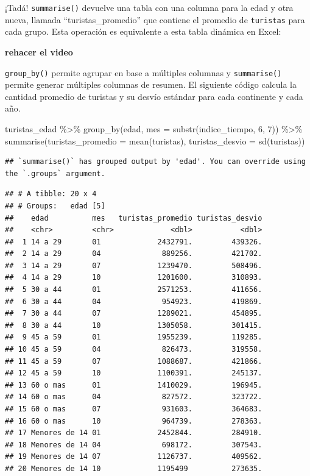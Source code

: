 \documentclass[
  openany]{book}
\newenvironment{Shaded}{\begin{snugshade}}{\end{snugshade}}
\newcommand{\AttributeTok}[1]{\textcolor[rgb]{0.77,0.63,0.00}{#1}}
\newcommand{\DecValTok}[1]{\textcolor[rgb]{0.00,0.00,0.81}{#1}}
\newcommand{\FunctionTok}[1]{\textcolor[rgb]{0.00,0.00,0.00}{#1}}
\newcommand{\NormalTok}[1]{#1}
\newcommand{\SpecialCharTok}[1]{\textcolor[rgb]{0.00,0.00,0.00}{#1}}
\begin{document}
¡Tadá!
\texttt{summarise()} devuelve una tabla con una columna para la edad y otra nueva, llamada ``turistas\_promedio'' que contiene el promedio de \texttt{turistas} para cada grupo.
Esta operación es equivalente a esta tabla dinámica en Excel:

\textbf{rehacer el video}

\texttt{group\_by()} permite agrupar en base a múltiples columnas y \texttt{summarise()} permite generar múltiples columnas de resumen.
El siguiente código calcula la cantidad promedio de turistas y su desvío estándar para cada continente y cada año.

\begin{Shaded}
\begin{Highlighting}[]
\NormalTok{turistas\_edad }\SpecialCharTok{\%\textgreater{}\%} 
  \FunctionTok{group\_by}\NormalTok{(edad, }\AttributeTok{mes =} \FunctionTok{substr}\NormalTok{(indice\_tiempo, }\DecValTok{6}\NormalTok{, }\DecValTok{7}\NormalTok{)) }\SpecialCharTok{\%\textgreater{}\%} 
  \FunctionTok{summarise}\NormalTok{(}\AttributeTok{turistas\_promedio =} \FunctionTok{mean}\NormalTok{(turistas),}
            \AttributeTok{turistas\_desvio =} \FunctionTok{sd}\NormalTok{(turistas))}
\end{Highlighting}
\end{Shaded}

\begin{verbatim}
## `summarise()` has grouped output by 'edad'. You can override using the `.groups` argument.
\end{verbatim}

\begin{verbatim}
## # A tibble: 20 x 4
## # Groups:   edad [5]
##    edad          mes   turistas_promedio turistas_desvio
##    <chr>         <chr>             <dbl>           <dbl>
##  1 14 a 29       01             2432791.         439326.
##  2 14 a 29       04              889256.         421702.
##  3 14 a 29       07             1239470.         508496.
##  4 14 a 29       10             1201600.         310893.
##  5 30 a 44       01             2571253.         411656.
##  6 30 a 44       04              954923.         419869.
##  7 30 a 44       07             1289021.         454895.
##  8 30 a 44       10             1305058.         301415.
##  9 45 a 59       01             1955239.         119285.
## 10 45 a 59       04              826473.         319558.
## 11 45 a 59       07             1088687.         421866.
## 12 45 a 59       10             1100391.         245137.
## 13 60 o mas      01             1410029.         196945.
## 14 60 o mas      04              827572.         323722.
## 15 60 o mas      07              931603.         364683.
## 16 60 o mas      10              964739.         278363.
## 17 Menores de 14 01             2452844.         284910.
## 18 Menores de 14 04              698172.         307543.
## 19 Menores de 14 07             1126737.         409562.
## 20 Menores de 14 10             1195499          273635.
\end{verbatim}
\end{document}
